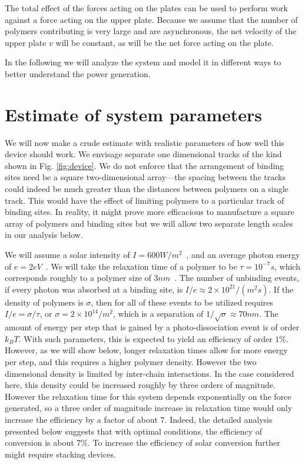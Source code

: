 \documentclass[11pt]{ucthesis}
\begin{document}
The total effect of the forces acting on the plates can be used to perform
work against a force acting on the upper plate. Because we assume that
the number of polymers contributing is very large and are asynchronous, the net velocity of the
upper plate $v$ will be constant, as will be the net force acting on the plate.

In the following we will analyze the system and model it in different ways to 
better understand the power generation.


\section{Estimate of system parameters}
\label{sec:EOSP}

We will now make a crude estimate with realistic parameters of how well this device should work.
We envisage separate one dimensional tracks of the kind shown in Fig.
\ref{fig:device}. We do not enforce that the arrangement of binding sites need be a square two-dimensional array---the spacing between the tracks could indeed be much greater than the distances between polymers on a single track. This would have the effect of limiting polymers to a particular track of binding sites. In reality, it might prove more efficacious to manufacture a square array of polymers and binding sites
but we will allow two separate length scales in our analysis below.

We will assume a solar intensity of $I = 600 W/m^2$~\cite{SunLiu}, and an average photon energy of  $e = 2eV$~\cite{Gates}. We
will take the relaxation
time of a polymer to be $\tau = 10^{-7}s$, which corresponds roughly to a polymer size of $3nm$~\cite{degennes}.
The number of unbinding events, if every photon was
absorbed at a binding site, is $I/e \approx 2\times 10^{21}/(m^2 s)$. If the density of polymers is
$\sigma$, then for all of these events to be utilized requires $I/e = \sigma/\tau$, or
$\sigma = 2\times 10^{14}/m^2$, which is a separation of $1/\sqrt{\sigma} \approx 70 nm$.
The amount of energy per step that is gained by a photo-dissociation event is of
order $k_B T$. With such parameters, this is expected to yield an efficiency of
order $1\%$. However, as we will show below, longer relaxation times allow 
for more energy per step, and this requires a higher polymer density. However
the two dimensional density is limited by inter-chain interactions. In the case
considered here, this density could be increased roughly by three orders of
magnitude. However the
relaxation time for this system depends exponentially on the force generated, so 
a three order of magnitude increase in relaxation time
would only increase the efficiency by a factor of about $7$. Indeed, the
detailed analysis presented below suggests that with optimal conditions, the
efficiency of conversion is about $7\%$.
To increase the efficiency of solar conversion further might require stacking devices.
\end{document}
